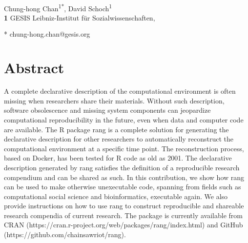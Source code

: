 \documentclass[
  10pt,
  letterpaper,
]{article}
\begin{document}
\vspace*{0.2in}

\begin{flushleft}
{\Large
\textbf{} %
}
\newline
\\
Chung-hong Chan\textsuperscript{1*}, David Schoch\textsuperscript{1}
\\
\bigskip
\textbf{1} GESIS Leibniz-Institut für Sozialwissenschaften, 
\bigskip


* chung-hong.chan@gesis.org

\end{flushleft}

\section*{Abstract}
A complete declarative description of the computational environment is
often missing when researchers share their materials. Without such
description, software obsolescence and missing system components can
jeopardize computational reproducibility in the future, even when data
and computer code are available. The R package rang is a complete
solution for generating the declarative description for other
researchers to automatically reconstruct the computational environment
at a specific time point. The reconstruction process, based on Docker,
has been tested for R code as old as 2001. The declarative description
generated by rang satisfies the definition of a reproducible research
compendium and can be shared as such. In this contribution, we show how
rang can be used to make otherwise unexecutable code, spanning from
fields such as computational social science and bioinformatics,
executable again. We also provide instructions on how to use rang to
construct reproducible and shareable research compendia of current
research. The package is currently available from CRAN
(https://cran.r-project.org/web/packages/rang/index.html) and GitHub
(https://github.com/chainsawriot/rang).
\end{document}
